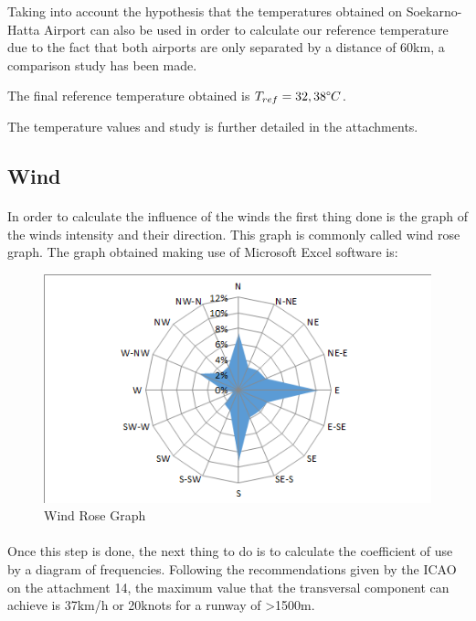 		Taking into account the hypothesis that the temperatures obtained on Soekarno-Hatta Airport can also be used in order to calculate our reference temperature due to the fact that both airports are only separated by a distance of 60km, a comparison study has been made. 
		
		The final reference temperature obtained is \(T_{ref}= 32,38\degree C\). 
		
		The temperature values and study is further detailed in the attachments.
		
		\subsection{Wind}
		\paragraph{}In order to calculate the influence of the winds the first thing done is the graph of the winds intensity and their direction. This graph is commonly called wind rose graph. The graph obtained making use of Microsoft Excel software is:
		
		\begin{figure}[H]
			\centering
			\includegraphics[clip, trim=0.03cm 0cm 0cm 0.03cm, width=1\textwidth]{./images/WIND/ROSE}
			\caption{Wind Rose Graph} %
			\label{} %
		\end{figure}
		
		\paragraph{}Once this step is done, the next thing to do is to calculate the coefficient of use by a diagram of
		frequencies. Following the recommendations given by the ICAO on the attachment 14, the
		maximum value that the transversal component can achieve is 37km/h or 20knots for a
		runway of >1500m.
		
